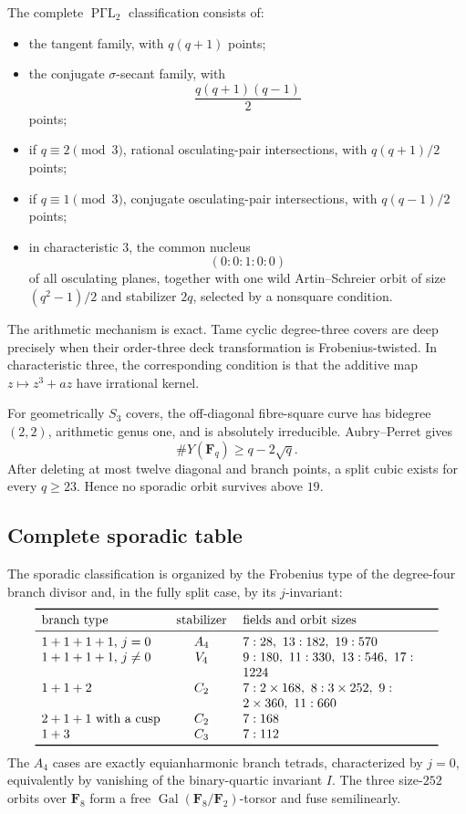 \documentclass[11pt]{article}
\newcommand{\F}{\mathbf F}
\newcommand{\PGammaL}{\operatorname{P\Gamma L}}
\newcommand{\Gal}{\operatorname{Gal}}
\begin{document}
The complete $\PGammaL_2$ classification consists of:
\begin{itemize}
\item the tangent family, with $q(q+1)$ points;
\item the conjugate $\sigma$-secant family, with
\[
 \frac{q(q+1)(q-1)}2
\]
points;
\item if $q\equiv2\pmod3$, rational osculating-pair intersections, with
$q(q+1)/2$ points;
\item if $q\equiv1\pmod3$, conjugate osculating-pair intersections, with
$q(q-1)/2$ points;
\item in characteristic $3$, the common nucleus
\[
 (0:0:1:0:0)
\]
of all osculating planes, together with one wild Artin--Schreier orbit of
size $(q^2-1)/2$ and stabilizer $2q$, selected by a nonsquare condition.
\end{itemize}

The arithmetic mechanism is exact.  Tame cyclic degree-three covers are
deep precisely when their order-three deck transformation is
Frobenius-twisted.  In characteristic three, the corresponding condition
is that the additive map $z\mapsto z^3+az$ have irrational kernel.

For geometrically $S_3$ covers, the off-diagonal fibre-square curve has
bidegree $(2,2)$, arithmetic genus one, and is absolutely irreducible.
Aubry--Perret gives
\[
 \#Y(\F_q)\geq q-2\sqrt q.
\]
After deleting at most twelve diagonal and branch points, a split cubic
exists for every $q\geq23$.  Hence no sporadic orbit survives above $19$.

\subsection{Complete sporadic table}

The sporadic classification is organized by the Frobenius type of the
degree-four branch divisor and, in the fully split case, by its
$j$-invariant:
\[
\begin{array}{>{\raggedright\arraybackslash}p{0.27\textwidth}
              >{\centering\arraybackslash}p{0.13\textwidth}
              >{\raggedright\arraybackslash}p{0.43\textwidth}}
\toprule
\text{branch type}&\text{stabilizer}&\text{fields and orbit sizes}\\
\midrule
$1+1+1+1$, $j=0$&
$A_4$&
$7:28,\ 13:182,\ 19:570$\\
$1+1+1+1$, $j\ne0$&
$V_4$&
$9:180,\ 11:330,\ 13:546,\ 17:1224$\\
$1+1+2$&
$C_2$&
$7:2\mathbin{\times}168,\ 8:3\mathbin{\times}252,\
9:2\mathbin{\times}360,\ 11:660$\\
$2+1+1$ with a cusp&
$C_2$&
$7:168$\\
$1+3$&
$C_3$&
$7:112$\\
\bottomrule
\end{array}
\]
The $A_4$ cases are exactly equianharmonic branch tetrads, characterized
by $j=0$, equivalently by vanishing of the binary-quartic invariant $I$.
The three size-$252$ orbits over $\F_8$ form a free
$\Gal(\F_8/\F_2)$-torsor and fuse semilinearly.
\end{document}
